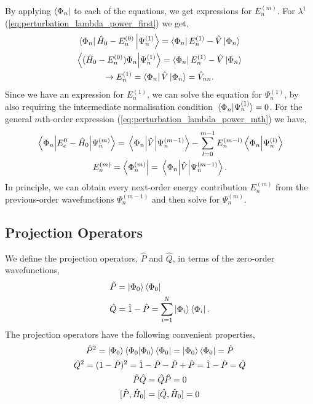 By applying $\bra{\Phi_n}$ to each of the equations, we get expressions 
for $E_n^{(m)}$. 
For $\lambda^1$ (\autoref{eq:perturbation_lambda_power_first}) we get,
\begin{equation}
    \begin{gathered}
    \bra{\Phi_n} \hat{H}_0 - E_n^{(0)}\ket{\Psi_n^{(1)}}
        = \bra{\Phi_n} E_n^{(1)} - \hat{V}\ket*{\Phi_n} \\
    \bra{(\hat{H}_0 - E_n^{(0)})\Phi_n} \ket{\Psi_n^{(1)}}
        = \bra{\Phi_n} E_n^{(1)} - \hat{V}\ket{\Phi_n} \\
    \to E_n^{(1)} = \bra{\Phi_n} \hat{V} \ket{\Phi_n} = \hat{V}_{nn}.
    \end{gathered}
\end{equation}
Since we have an expression for $E_n^{(1)}$, we can solve the equation
for $\Psi_n^{(1)}$, by also requiring the intermediate
normalisation condition $\braket*{\Phi_n}{\Psi_n^{(1)}} = 0$. For 
the general $m$th-order expression (\autoref{eq:perturbation_lambda_power_mth})
we have,
\begin{equation}
    \begin{gathered}
        \mel{\Phi_n} {E_e^{0} - \hat{H}_0}{\Psi_n^{(m)}}
            = \mel{\Phi_n} {\hat{V}} {\Psi_n^{(m-1)}}
            - \sum_{l=0}^{m-1}E_n^{(m-l)}\braket{\Phi_n}{\Psi_n^{(l)}} \\
        E_n^{(m)} = \bra{\Phi_n^{(m)}} = \mel{\Phi_n} {\hat{V}} {\Psi_n^{(m-1)}}.
    \end{gathered}
\end{equation} 
In principle, we can obtain every next-order energy contribution $E_n^{(m)}$ from 
the previous-order wavefunctions $\Psi_n^{(m-1)}$ and then solve for $\Psi_n^{(m)}$.

\subsection{Projection Operators}
We define the projection operators, $\hat{P}$ and $\hat{Q}$, in terms of the
zero-order wavefunctions,
\begin{equation}
    \begin{aligned}
        \hat{P} &= \ket{\Phi_0} \bra{\Phi_0} \\
        \hat{Q} &= \hat{1} - \hat{P} = \sum_{i=1}^N \ket{\Phi_i} \bra{\Phi_i}.
    \end{aligned}
\end{equation}
The projection operators have the following convenient properties,
\begin{equation}
    \begin{gathered}
    \hat{P}^2 =  \ket{\Phi_0}\bra{\Phi_0}\ket{\Phi_0}\bra{\Phi_0} 
        = \ket{\Phi_0}\bra{\Phi_0} = \hat{P} \\
    \hat{Q}^2 = (1 - \hat{P})^2 = \hat{1} - \hat{P} - \hat{P} + \hat{P}
        = \hat{1} - \hat{P} = \hat{Q} \\
    \hat{P}\hat{Q} = \hat{Q} \hat{P} = 0 \\
    [ \hat{P}, \hat{H}_0 ] = [ \hat{Q}, \hat{H}_0 ] = 0
    \end{gathered}
\end{equation}

